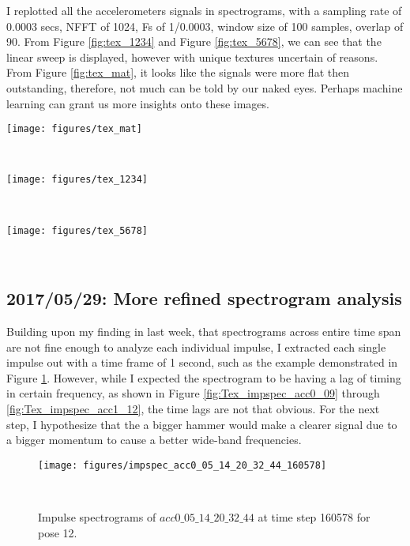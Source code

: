 \documentclass{sigchi}
\begin{document}
I replotted all the accelerometers signals in spectrograms, with a sampling rate of 0.0003 secs, NFFT of 1024, Fs of 1/0.0003, window size of 100 samples, overlap of 90. From Figure \ref{fig:tex_1234} and Figure \ref{fig:tex_5678}, we can see that the linear sweep is displayed, however with unique textures uncertain of reasons. From Figure \ref{fig:tex_mat}, it looks like the signals were more flat then outstanding, therefore, not much can be told by our naked eyes. Perhaps machine learning can grant us more insights onto these images.

\begin{figure*}
  \centering
  \texttt{[image: figures/tex\_mat]}
  \caption{Spectrograms for the four experiments previously on the signal difference hitting with different materials.}
    ~\label{fig:tex_mat}
\end{figure*}

\begin{figure*}
  \centering
  \texttt{[image: figures/tex\_1234]}
  \caption{Spectrograms for the four experiments previously in Pose 1 through 4.}
    ~\label{fig:tex_1234}
\end{figure*}

\begin{figure*}
  \centering
  \texttt{[image: figures/tex\_5678]}
  \caption{Spectrograms for the four experiments previously in Pose 5 through 8.}
    ~\label{fig:tex_5678}
\end{figure*}

\subsection{2017/05/29: More refined spectrogram analysis}

Building upon my finding in last week, that spectrograms across entire time span are not fine enough to analyze each individual impulse, I extracted each single impulse out with a time frame of 1 second, such as the example demonstrated in Figure \ref{fig:impspec_acc0_05_14_20_32_44_160578}. However, while I expected the spectrogram to be having a lag of timing in certain frequency, as shown in Figure \ref{fig:Tex_impspec_acc0_09} through \ref{fig:Tex_impspec_acc1_12}, the time lags are not that obvious. For the next step, I hypothesize that the a bigger hammer would make a clearer signal due to a bigger momentum to cause a better wide-band frequencies.

\begin{figure}
  \centering
  \texttt{[image: figures/impspec\_acc0\_05\_14\_20\_32\_44\_160578]}
  \caption{Impulse spectrograms of $acc0\_05\_14\_20\_32\_44$ at time step 160578 for pose 12.}
    ~\label{fig:impspec_acc0_05_14_20_32_44_160578}
\end{figure}
\end{document}
